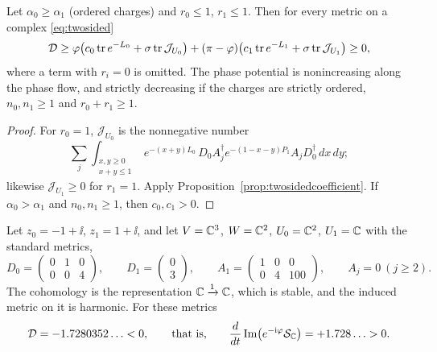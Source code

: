 \begin{theorem}\label{thm:rankone}
Let $\alpha_0\geq\alpha_1$ (ordered charges) and $r_0\leq1$, $r_1\leq1$. Then for every metric
on a complex \eqref{eq:twosided}
\[
 \mathcal D\geq\varphi\bigl(c_0\operatorname{tr} e^{-L_0}+\sigma\operatorname{tr}\mathcal J_{U_0}\bigr)
 +(\pi-\varphi)\bigl(c_1\operatorname{tr} e^{-L_1}+\sigma\operatorname{tr}\mathcal J_{U_1}\bigr)\geq0,
\]
where a term with $r_i=0$ is omitted. The phase potential is nonincreasing
along the phase flow, and strictly decreasing if the charges are strictly
ordered, $n_0,n_1\geq1$ and $r_0+r_1\geq1$.
\end{theorem}

\begin{proof}
For $r_0=1$, $\mathcal J_{U_0}$ is the nonnegative number
\[
 \sum_j\int_{\substack{x,y\geq0\\x+y\leq1}}e^{-(x+y)L_0}\,D_0A_j^\dagger e^{-(1-x-y)P_1}A_jD_0^\dagger\,dx\,dy ;
\]
likewise $\mathcal J_{U_1}\geq0$ for $r_1=1$. Apply
Proposition~\ref{prop:twosidedcoefficient}. If $\alpha_0>\alpha_1$ and
$n_0,n_1\geq1$, then $c_0,c_1>0$.
\end{proof}

\begin{theorem}[Ranks $(2,1)$]\label{thm:twosidedfailure}
Let $z_0=-1+\ii$, $z_1=1+\ii$, and let $V=\mathbb C^3$, $W=\mathbb C^2$, $U_0=\mathbb C^2$,
$U_1=\mathbb C$ with the standard metrics,
\[
 D_0=\begin{pmatrix}0&1&0\\0&0&4\end{pmatrix},\qquad
 D_1=\begin{pmatrix}0\\3\end{pmatrix},\qquad
 A_1=\begin{pmatrix}1&0&0\\0&4&100\end{pmatrix},\qquad A_j=0\ (j\geq2).
\]
The cohomology is the representation $\mathbb C\xrightarrow{1}\mathbb C$, which is
stable, and the induced metric on it is harmonic. For these metrics
\[
 \mathcal D=-1.7280352\ldots<0,\qquad\text{that is,}\qquad
 \frac d{dt}\operatorname{Im}\bigl(e^{-\mathrm i\varphi}\mathcal S_{\mathbb C}\bigr)=+1.728\ldots>0 .
\]
\end{theorem}

